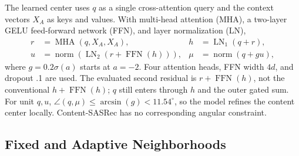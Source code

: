 \documentclass[runningheads]{llncs}
\begin{document}
The learned center uses $q$ as a single cross-attention query and the context
vectors $X_A$ as keys and values. With multi-head attention (MHA), a two-layer
GELU feed-forward network (FFN), and layer normalization (LN),
\begin{align}
 r&=\operatorname{MHA}(q,X_A,X_A),
 &h&=\operatorname{LN}_1(q+r),\\
 u&=\operatorname{norm}\!\left(\operatorname{LN}_2(r+\operatorname{FFN}(h))\right),
 &\mu&=\operatorname{norm}(q+g u),
 \label{eq:center}
\end{align}
where $g=0.2\sigma(a)$ starts at $a=-2$. Four attention heads, FFN width $4d$,
and dropout .1 are used. The evaluated second residual is
$r+\operatorname{FFN}(h)$, not the conventional $h+\operatorname{FFN}(h)$;
$q$ still enters through $h$ and the outer gated sum. For unit $q,u$,
$\angle(q,\mu)\leq\arcsin(g)<11.54^\circ$, so the model refines the content
center locally. Content-SASRec has no corresponding angular constraint.

\subsection{Fixed and Adaptive Neighborhoods}
\end{document}
